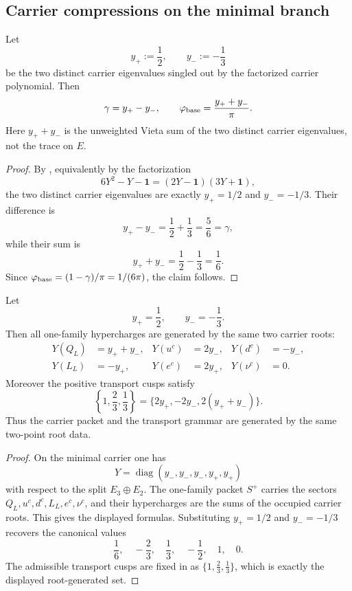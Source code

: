 \subsection{Carrier compressions on the minimal branch}

\begin{corollary}
Let
\[
y_+:=\frac12,
\qquad
y_-:=-\frac13
\]
be the two distinct carrier eigenvalues singled out by the factorized carrier polynomial. Then
\[
\gamma=y_+-y_-,
\qquad
\varphi_{\mathrm{base}}=\frac{y_++y_-}{\pi}.
\]
Here $y_++y_-$ is the unweighted Vieta sum of the two distinct carrier eigenvalues, not the trace on $E$.
\end{corollary}

\begin{proof}
By , equivalently by the factorization
\[
6Y^2-Y-\mathbf 1=(2Y-\mathbf 1)(3Y+\mathbf 1),
\]
the two distinct carrier eigenvalues are exactly $y_+=1/2$ and $y_-=-1/3$. Their difference is
\[
y_+-y_-=\frac12+\frac13=\frac56=\gamma,
\]
while their sum is
\[
y_++y_-=\frac12-\frac13=\frac16.
\]
Since $\varphi_{\mathrm{base}}=(1-\gamma)/\pi=1/(6\pi)$, the claim follows.
\end{proof}

\begin{proposition}
\label{prop:dual-root-generation}
Let
\[
y_+=\frac12,
\qquad
y_-=-\frac13.
\]
Then all one-family hypercharges are generated by the same two carrier roots:
\[
\begin{aligned}
Y(Q_L)&=y_++y_-,
&
Y(u^c)&=2y_-,
&
Y(d^c)&=-y_-,
\\
Y(L_L)&=-y_+,
&
Y(e^c)&=2y_+,
&
Y(\nu^c)&=0.
\end{aligned}
\]
Moreover the positive transport cusps satisfy
\[
\left\{1,\frac23,\frac13\right\}=\{2y_+,-2y_-,2(y_++y_-)\}.
\]
Thus the carrier packet and the transport grammar are generated by the same two-point root data.
\end{proposition}

\begin{proof}
On the minimal carrier one has
\[
Y=\operatorname{diag}(y_-,y_-,y_-,y_+,y_+)
\]
with respect to the split $E_3\oplus E_2$. The one-family packet $S^+$ carries the sectors
$Q_L,u^c,d^c,L_L,e^c,\nu^c$, and their hypercharges are the sums of the occupied carrier roots.
This gives the displayed formulas. Substituting $y_+=1/2$ and $y_-=-1/3$ recovers the canonical
values
\[
\frac16,\quad
-\frac23,\quad
\frac13,\quad
-\frac12,\quad
1,\quad
0.
\]
The admissible transport cusps are fixed in  as
$\{1,\frac23,\frac13\}$, which is exactly the displayed root-generated set.
\end{proof}

